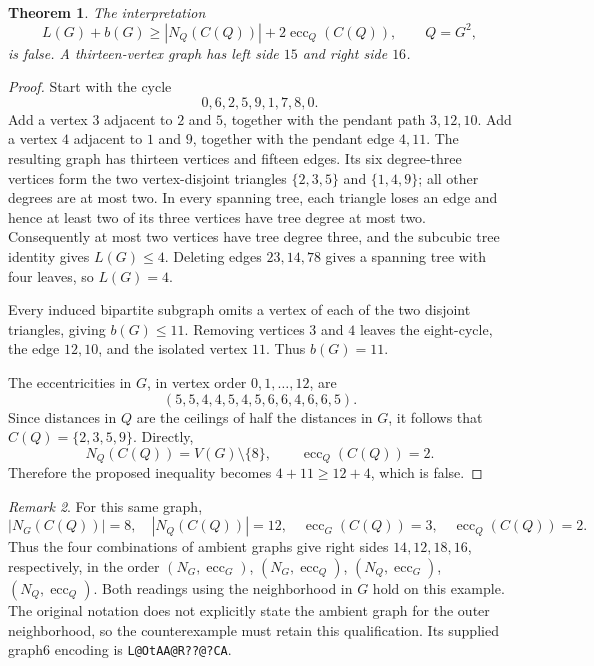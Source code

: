 \documentclass[11pt,a4paper]{article}
\newtheorem{theorem}{Theorem}[section]
\theoremstyle{remark}
\newtheorem{remark}[theorem]{Remark}
\begin{document}
\begin{theorem}\label{r7leaf:counter186reading}
The interpretation
\[
 L(G)+b(G)\ge |N_Q(C(Q))|+2\operatorname{ecc}_Q(C(Q)),\qquad Q=G^2,
\]
is false.  A thirteen-vertex graph has left side $15$ and right side $16$.
\end{theorem}

\begin{proof}
Start with the cycle
\[
 0,6,2,5,9,1,7,8,0.
\]
Add a vertex $3$ adjacent to $2$ and $5$, together with the pendant path
$3,12,10$.  Add a vertex $4$ adjacent to $1$ and $9$, together with the
pendant edge $4,11$.  The resulting graph has thirteen vertices and fifteen
edges.  Its six degree-three vertices form the two vertex-disjoint triangles
$\{2,3,5\}$ and $\{1,4,9\}$; all other degrees are at most two.
In every spanning tree, each triangle loses an edge and hence at least two
of its three vertices have tree degree at most two.  Consequently at most
two vertices have tree degree three, and the subcubic tree identity gives
$L(G)\le4$.  Deleting edges $23,14,78$ gives a spanning tree with four
leaves, so $L(G)=4$.

Every induced bipartite subgraph omits a vertex of each of the two disjoint
triangles, giving $b(G)\le11$.  Removing vertices $3$ and $4$ leaves the
eight-cycle, the edge $12,10$, and the isolated vertex $11$.  Thus
$b(G)=11$.

The eccentricities in $G$, in vertex order $0,1,\ldots,12$, are
\[
 (5,5,4,4,5,4,5,6,6,4,6,6,5).
\]
Since distances in $Q$ are the ceilings of half the distances in $G$, it
follows that $C(Q)=\{2,3,5,9\}$.  Directly,
\[
 N_Q(C(Q))=V(G)\setminus\{8\},\qquad
 \operatorname{ecc}_Q(C(Q))=2.
\]
Therefore the proposed inequality becomes $4+11\ge12+4$, which is false.
\end{proof}

\begin{remark}\label{r7leaf:ambient186}
For this same graph,
\[
 |N_G(C(Q))|=8,\quad |N_Q(C(Q))|=12,\quad
 \operatorname{ecc}_G(C(Q))=3,\quad
 \operatorname{ecc}_Q(C(Q))=2.
\]
Thus the four combinations of ambient graphs give right sides
$14,12,18,16$, respectively, in the order
$(N_G,\operatorname{ecc}_G)$,
$(N_G,\operatorname{ecc}_Q)$,
$(N_Q,\operatorname{ecc}_G)$,
$(N_Q,\operatorname{ecc}_Q)$.
Both readings using the neighborhood in $G$ hold on this example.
The original notation does not explicitly state the ambient graph for the
outer neighborhood, so the counterexample must retain this qualification.
Its supplied graph6 encoding is \texttt{L@OtAA@R??@?CA}.
\end{remark}
\end{document}
